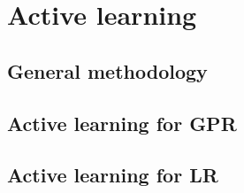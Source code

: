 \section{Active learning}\label{sec:AL}
\subsection{General methodology}\label{sec:AL-method}
\subsection{Active learning for GPR}\label{sec:GPAL}
\subsection{Active learning for LR}\label{sec:LRAL}
